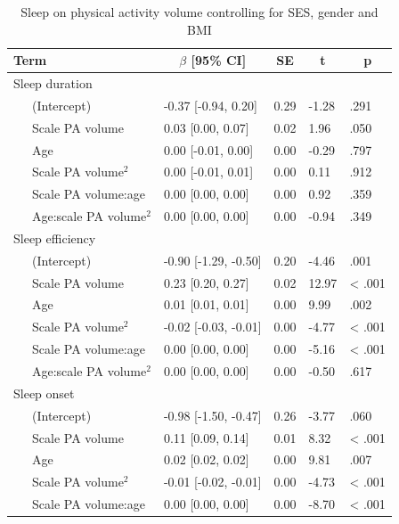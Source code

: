 \documentclass[
  man]{apa6}
\begin{document}
\begin{table}[tbp]

\begin{center}
\begin{threeparttable}

\caption{\label{tab:sleep-by-volume}Sleep on physical activity volume controlling for SES, gender and BMI}

\begin{tabular}{lllll}
\toprule
Term & \multicolumn{1}{c}{$\beta$ [95\% CI]} & \multicolumn{1}{c}{SE} & \multicolumn{1}{c}{t} & \multicolumn{1}{c}{p}\\
\midrule
Sleep duration &  &  &  & \\
\ \ \ (Intercept) & -0.37 [-0.94, 0.20] & 0.29 & -1.28 & .291\\
\ \ \ Scale PA volume & 0.03 [0.00, 0.07] & 0.02 & 1.96 & .050\\
\ \ \ Age & 0.00 [-0.01, 0.00] & 0.00 & -0.29 & .797\\
\ \ \ Scale PA volume$^2$ & 0.00 [-0.01, 0.01] & 0.00 & 0.11 & .912\\
\ \ \ Scale PA volume:age & 0.00 [0.00, 0.00] & 0.00 & 0.92 & .359\\
\ \ \ Age:scale PA volume$^2$ & 0.00 [0.00, 0.00] & 0.00 & -0.94 & .349\\
Sleep efficiency &  &  &  & \\
\ \ \ (Intercept) & -0.90 [-1.29, -0.50] & 0.20 & -4.46 & .001\\
\ \ \ Scale PA volume & 0.23 [0.20, 0.27] & 0.02 & 12.97 & < .001\\
\ \ \ Age & 0.01 [0.01, 0.01] & 0.00 & 9.99 & .002\\
\ \ \ Scale PA volume$^2$ & -0.02 [-0.03, -0.01] & 0.00 & -4.77 & < .001\\
\ \ \ Scale PA volume:age & 0.00 [0.00, 0.00] & 0.00 & -5.16 & < .001\\
\ \ \ Age:scale PA volume$^2$ & 0.00 [0.00, 0.00] & 0.00 & -0.50 & .617\\
Sleep onset &  &  &  & \\
\ \ \ (Intercept) & -0.98 [-1.50, -0.47] & 0.26 & -3.77 & .060\\
\ \ \ Scale PA volume & 0.11 [0.09, 0.14] & 0.01 & 8.32 & < .001\\
\ \ \ Age & 0.02 [0.02, 0.02] & 0.00 & 9.81 & .007\\
\ \ \ Scale PA volume$^2$ & -0.01 [-0.02, -0.01] & 0.00 & -4.73 & < .001\\
\ \ \ Scale PA volume:age & 0.00 [0.00, 0.00] & 0.00 & -8.70 & < .001\\

\end{tabular}
\end{threeparttable}
\end{center}
\end{table}
\end{document}
